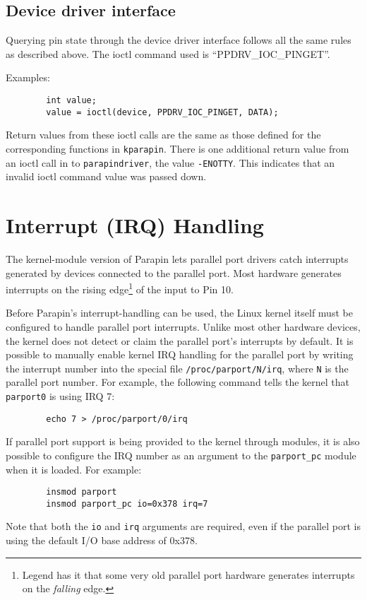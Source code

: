 \documentclass{article}
\begin{document}
\subsection{Device driver interface}

Querying pin state through the device driver interface follows all
the same rules as described above.
The ioctl command used is ``PPDRV\_IOC\_PINGET''.

Examples:
\begin {verbatim}
        int value;
        value = ioctl(device, PPDRV_IOC_PINGET, DATA);
\end{verbatim}

Return values from these ioctl calls are the same as those defined for
the corresponding functions in {\tt kparapin}.  There is one additional
return value from an ioctl call in to {\tt parapindriver}, the value
{\tt -ENOTTY}.  This indicates that an invalid ioctl command value was
passed down.


\section{Interrupt (IRQ) Handling}
\label{interrupts}

The kernel-module version of Parapin lets parallel port drivers catch
interrupts generated by devices connected to the parallel port.  Most
hardware generates interrupts on the rising edge\footnote{Legend has
it that some very old parallel port hardware generates interrupts on
the {\em falling} edge.} of the input to Pin 10.

Before Parapin's interrupt-handling can be used, the Linux kernel
itself must be configured to handle parallel port interrupts.  Unlike
most other hardware devices, the kernel does not detect or claim the
parallel port's interrupts by default.  It is possible to manually
enable kernel IRQ handling for the parallel port by writing the
interrupt number into the special file {\tt /proc/parport/N/irq},
where {\tt N} is the parallel port number.  For example, the following
command tells the kernel that {\tt parport0} is using IRQ 7:
\begin{verbatim}
        echo 7 > /proc/parport/0/irq
\end{verbatim}
If parallel port support is being provided to the kernel through
modules, it is also possible to configure the IRQ number as an
argument to the {\tt parport\_pc} module when it is loaded.  For
example:
\begin{verbatim}
        insmod parport
        insmod parport_pc io=0x378 irq=7
\end{verbatim}
Note that both the {\tt io} and {\tt irq} arguments are required, even
if the parallel port is using the default I/O base address of 0x378.
\end{document}
